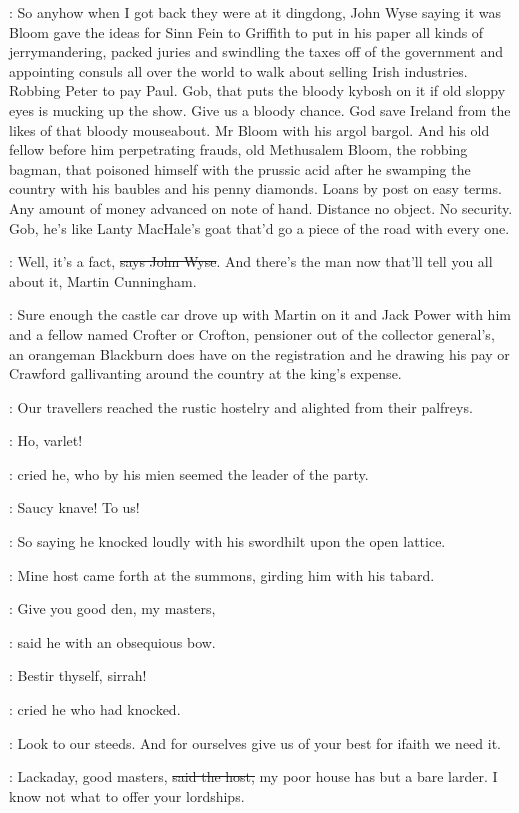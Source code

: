 \Nq:
So anyhow when I got back they were at it dingdong, John Wyse
saying it was Bloom gave the ideas for Sinn Fein to Griffith to put in his
paper all kinds of jerrymandering, packed juries and swindling the taxes
off of the government and appointing consuls all over the world to walk
about selling Irish industries. Robbing Peter to pay Paul. Gob, that puts
the bloody kybosh on it if old sloppy eyes is mucking up the show. Give us
a bloody chance. God save Ireland from the likes of that bloody
mouseabout. Mr Bloom with his argol bargol. And his old fellow before him
perpetrating frauds, old Methusalem Bloom, the robbing bagman, that
poisoned himself with the prussic acid after he swamping the country with
his baubles and his penny diamonds. Loans by post on easy terms. Any
amount of money advanced on note of hand. Distance no object. No security.
Gob, he's like Lanty MacHale's goat that'd go a piece of the road with
every one.

\johnwyse:
Well, it's a fact, \sout{says John Wyse}.
And there's the man now that'll tell
you all about it, Martin Cunningham.

\Nq:
Sure enough the castle car drove up with Martin on it and Jack Power
with him and a fellow named Crofter or Crofton, pensioner out of the
collector general's, an orangeman Blackburn does have on the registration
and he drawing his pay or Crawford gallivanting around the country at the
king's expense.

:
Our travellers reached the rustic hostelry and alighted from their
palfreys.

\cunningham:
Ho, varlet!

:
cried he, who by his mien seemed the leader of the party.

\cunningham:
Saucy knave! To us!

:
So saying he knocked loudly with his swordhilt upon the open lattice.

:
Mine host came forth at the summons, girding him with his tabard.

\terry:
Give you good den, my masters,

:
said he with an obsequious bow.

\cunningham:
Bestir thyself, sirrah!

:
cried he who had knocked.

\cunningham:
Look to our steeds.
And for ourselves give us of your best for ifaith we need it.

\terry:
Lackaday, good masters, \sout{said the host,}
my poor house has but a bare
larder. I know not what to offer your lordships.

